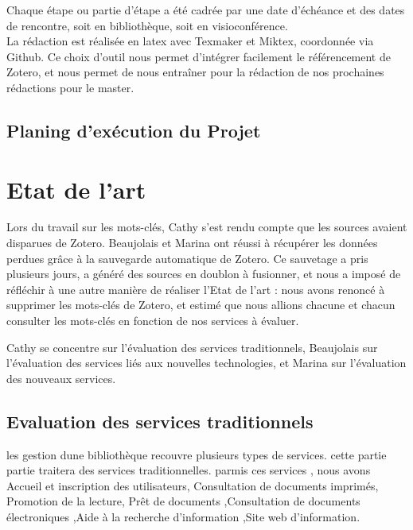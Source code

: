 \documentclass[french,a4paper,12pt]{article}
\begin{document}
Chaque étape ou partie d’étape a été cadrée par une date d’échéance et des dates de rencontre, soit en bibliothèque, soit en visioconférence. \\

La rédaction est réalisée en latex avec Texmaker et Miktex, coordonnée via Github. Ce choix d’outil nous permet d’intégrer facilement le référencement de Zotero, et nous permet de nous entraîner pour la rédaction de nos prochaines rédactions pour le master. \\

\subsection{Planing d'exécution du Projet}





\newpage
\section{Etat de l'art}

\quad Lors du travail sur les mots-clés, Cathy s’est rendu compte que les sources avaient disparues de Zotero. Beaujolais et Marina ont réussi à récupérer les données perdues grâce à la sauvegarde automatique de Zotero. Ce sauvetage a pris plusieurs jours, a généré des sources en doublon à fusionner, et nous a imposé de réfléchir à une autre manière de réaliser l’Etat de l'art : nous avons renoncé à supprimer les mots-clés de Zotero, et estimé que nous allions chacune et chacun consulter les mots-clés en fonction de nos services à évaluer. 

Cathy se concentre sur l’évaluation des services traditionnels, Beaujolais sur l’évaluation des services liés aux nouvelles technologies, et Marina sur l’évaluation des nouveaux services.



\subsection{Evaluation des services traditionnels}


\quad les gestion dune bibliothèque recouvre plusieurs types de services. cette partie partie traitera des services traditionnelles. parmis ces services , nous avons Accueil et inscription des utilisateurs, Consultation de documents imprimés, Promotion de la lecture, Prêt de documents ,Consultation de documents électroniques ,Aide à la recherche d’information ,Site web d’information.  
\end{document}
